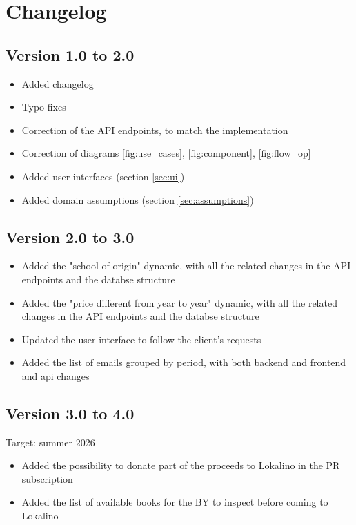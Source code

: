 \chapter{Changelog}
\section{Version 1.0 to 2.0}
\begin{itemize}
    \item Added changelog
    \item Typo fixes
    \item Correction of the API endpoints, to match the implementation
    \item Correction of diagrams \ref{fig:use_cases}, \ref{fig:component}, \ref{fig:flow_op}
    \item Added user interfaces (section \ref{sec:ui})
    \item Added domain assumptions (section \ref{sec:assumptions})
\end{itemize}
\section{Version 2.0 to 3.0}
\begin{itemize}
    \item Added the "school of origin" dynamic, with all the related changes in the API endpoints and the databse structure
    \item Added the "price different from year to year" dynamic, with all the related changes in the API endpoints and the databse structure
    \item Updated the user interface to follow the client's requests
    \item Added the list of emails grouped by period, with both backend and frontend and api changes
\end{itemize}
\section{Version 3.0 to 4.0}
Target: summer 2026
\begin{itemize}
    \item Added the possibility to donate part of the proceeds to Lokalino in the PR subscription
    \item Added the list of available books for the BY to inspect before coming to Lokalino
\end{itemize}